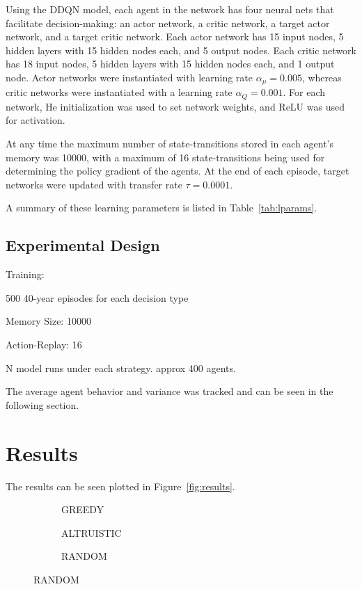 \documentclass[prepare]{acmconf} %
\begin{document}
Using the DDQN model, each agent in the network has four neural nets
that facilitate decision-making:
an actor network, a critic network, a target actor network, and a target
critic network.
Each actor network has 15 input nodes, 5 hidden layers with 15 hidden nodes
each, and 5 output nodes.
Each critic network has 18 input nodes, 5 hidden layers with 15 hidden nodes
each, and 1 output node.
Actor networks were instantiated with learning rate $\alpha_\mu = 0.005$,
whereas critic networks were instantiated with a learning rate 
$\alpha_Q = 0.001$.
For each network, He initialization was used to set network weights,
and ReLU was used for activation.

At any time the maximum number of state-transitions stored in each 
agent's memory was 10000,
with a maximum of 16 state-transitions being used for determining
the policy gradient of the agents. 
At the end of each episode, target networks were updated with transfer
rate $\tau = 0.0001$.

A summary of these learning parameters is listed in 
Table~\ref{tab:lparams}.

\subsection{Experimental Design}

Training:

500 40-year episodes for each decision type

Memory Size: 10000

Action-Replay: 16

N model runs under each strategy. approx 400 agents.

The average agent behavior and variance was tracked and can be seen in
the following section.

\section{Results}
\label{sec:results}

The results can be seen plotted in Figure~\ref{fig:results}.

\begin{figure}
\caption{Results}
\label{fig:results}
\begin{subfigure}{0.48\textwidth}
\caption{GREEDY}
\end{subfigure}

\begin{subfigure}{0.48\textwidth}
\caption{ALTRUISTIC}
\end{subfigure}

\begin{subfigure}{0.48\textwidth}
\caption{RANDOM}
\end{subfigure}
\end{figure}
\end{document}
